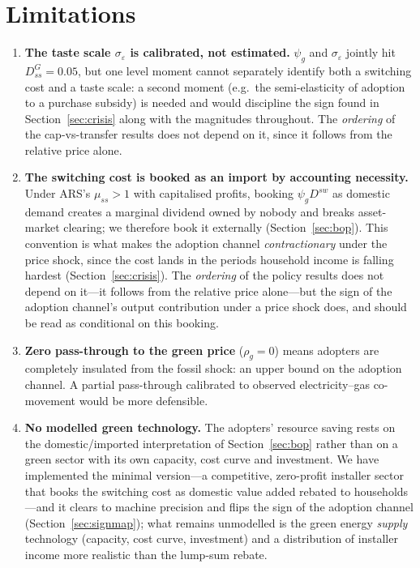\documentclass[11pt,a4paper]{article}
\begin{document}
\section{Limitations}
\label{sec:limits}

\begin{enumerate}\itemsep3pt

\item \textbf{The taste scale $\sigma_{\varepsilon}$ is calibrated, not
estimated.} $\psi_g$ and $\sigma_\varepsilon$ jointly hit $D^G_{ss}=0.05$, but
one level moment cannot separately identify both a switching cost and a taste
scale: a second moment (e.g.\ the semi-elasticity of adoption to a purchase
subsidy) is needed and would discipline the sign found in
Section~\ref{sec:crisis} along with the magnitudes throughout. The \emph{ordering} of the
cap-vs-transfer results does not depend on it, since it follows from the
relative price alone.

\item \textbf{The switching cost is booked as an import by accounting
necessity.} Under ARS's $\mu_{ss}>1$ with capitalised profits, booking
$\psi_g D^{sw}$ as domestic demand creates a marginal dividend owned by nobody
and breaks asset-market clearing; we therefore book it externally
(Section~\ref{sec:bop}). This convention is what makes the adoption channel
\emph{contractionary} under the price shock, since the cost lands in the
periods household income is falling hardest (Section~\ref{sec:crisis}). The \emph{ordering}
of the policy results does not depend on it---it follows from the relative
price alone---but the sign of the adoption channel's output contribution under
a price shock does, and should be read as conditional on this booking.

\item \textbf{Zero pass-through to the green price} ($\rho_g=0$) means
adopters are completely insulated from the fossil shock: an upper bound on
the adoption channel. A partial pass-through calibrated to observed
electricity--gas co-movement would be more defensible.

\item \textbf{No modelled green technology.} The adopters' resource saving
rests on the domestic/imported interpretation of Section~\ref{sec:bop} rather
than on a green sector with its own capacity, cost curve and investment. We
have implemented the minimal version---a competitive, zero-profit installer
sector that books the switching cost as domestic value added rebated to
households---and it clears to machine precision and flips the sign of the
adoption channel (Section~\ref{sec:signmap}); what remains unmodelled is the
green energy \emph{supply} technology (capacity, cost curve, investment) and a
distribution of installer income more realistic than the lump-sum rebate.


\end{enumerate}
\end{document}
